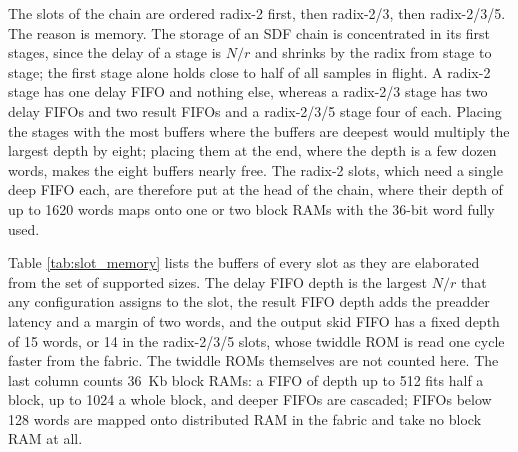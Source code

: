 \documentclass[a4paper,12pt, master]{etf}
\begin{document}
The slots of the chain are ordered radix-2 first, then radix-2/3, then radix-2/3/5. The reason is memory. The storage of an SDF chain is concentrated in its first stages, since the delay of a stage is $N/r$ and shrinks by the radix from stage to stage; the first stage alone holds close to half of all samples in flight. A radix-2 stage has one delay FIFO and nothing else, whereas a radix-2/3 stage has two delay FIFOs and two result FIFOs and a radix-2/3/5 stage four of each. Placing the stages with the most buffers where the buffers are deepest would multiply the largest depth by eight; placing them at the end, where the depth is a few dozen words, makes the eight buffers nearly free. The radix-2 slots, which need a single deep FIFO each, are therefore put at the head of the chain, where their depth of up to 1620 words maps onto one or two block RAMs with the 36-bit word fully used.

Table \ref{tab:slot_memory} lists the buffers of every slot as they are elaborated from the set of supported sizes. The delay FIFO depth is the largest $N/r$ that any configuration assigns to the slot, the result FIFO depth adds the preadder latency and a margin of two words, and the output skid FIFO has a fixed depth of 15 words, or 14 in the radix-2/3/5 slots, whose twiddle ROM is read one cycle faster from the fabric. The twiddle ROMs themselves are not counted here. The last column counts 36~Kb block RAMs: a FIFO of depth up to 512 fits half a block, up to 1024 a whole block, and deeper FIFOs are cascaded; FIFOs below 128 words are mapped onto distributed RAM in the fabric and take no block RAM at all.
\end{document}
